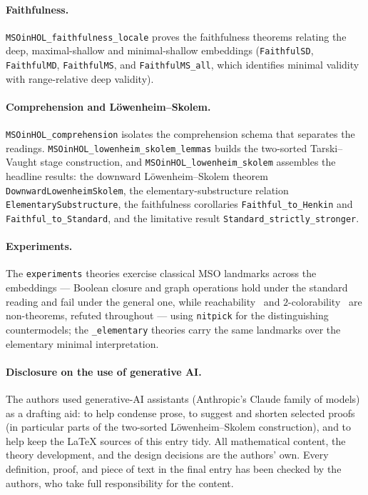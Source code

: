 \documentclass[11pt,a4paper]{article}
\newcommand{\bk}{\_\penalty10\hspace{0pt}}
\begin{document}
\paragraph{Faithfulness.}
\texttt{MSOinHOL\bk faithfulness\bk locale} proves the faithfulness theorems
relating the deep, maximal-shallow and minimal-shallow embeddings
(\texttt{FaithfulSD}, \texttt{FaithfulMD}, \texttt{FaithfulMS}, and
\texttt{FaithfulMS\_all}, which identifies minimal validity with range-relative
deep validity).

\paragraph{Comprehension and L\"owenheim--Skolem.}
\texttt{MSOinHOL\bk comprehension} isolates the comprehension schema that
separates the readings. \texttt{MSOinHOL\bk lowenheim\bk skolem\bk lemmas}
builds the two-sorted Tarski--Vaught stage construction, and
\texttt{MSOinHOL\bk lowenheim\bk skolem} assembles the headline results: the
downward L\"owenheim--Skolem theorem \texttt{DownwardLowenheimSkolem}, the
elementary-substructure relation \texttt{ElementarySubstructure}, the
faithfulness corollaries \texttt{Faithful\bk to\bk Henkin} and
\texttt{Faithful\bk to\bk Standard}, and the limitative result
\texttt{Standard\bk strictly\bk stronger}.

\paragraph{Experiments.}
The \texttt{experiments} theories exercise classical MSO landmarks across the
embeddings --- Boolean closure and graph operations hold under the standard
reading and fail under the general one, while reachability~\cite{BasinKlarlund1995}
and $2$-colorability~\cite{Thomas1997} are non-theorems, refuted throughout ---
using \texttt{nitpick} for the
distinguishing countermodels; the \texttt{\_elementary} theories carry the same
landmarks over the elementary minimal interpretation.

\paragraph{Disclosure on the use of generative AI.}
The authors used generative-AI assistants (Anthropic's Claude family of
models) as a drafting aid: to help condense prose, to suggest and shorten
selected proofs (in particular parts of the two-sorted
L\"owenheim--Skolem construction), and to help keep the \LaTeX{} sources of
this entry tidy. All mathematical content, the theory development, and the
design decisions are the authors' own. Every definition, proof, and piece
of text in the final entry has been checked by the authors, who take full
responsibility for the content.
\end{document}
